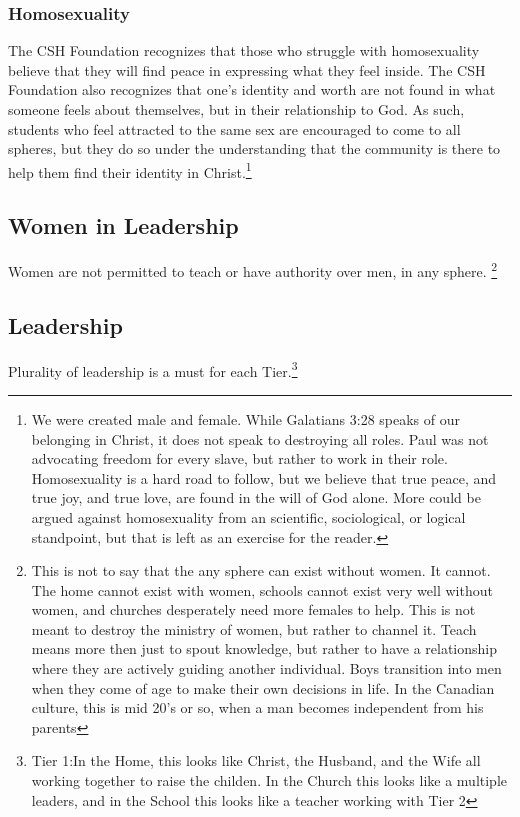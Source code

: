 \documentclass[CSHFoundation.tex]{subfiles}
\begin{document}
\subsubsection{Homosexuality}
The CSH Foundation recognizes that those who struggle with homosexuality believe that they will find peace in expressing what they feel inside. The CSH Foundation also recognizes that one's identity and worth are not found in what someone feels about themselves, but in their relationship to God. As such, students who feel attracted to the same sex are encouraged to come to all spheres, but they do so under the understanding that the community is there to help them find their identity in Christ.\footnote{We were created male and female. While Galatians 3:28 speaks of our belonging in Christ, it does not speak to destroying all roles. Paul was not advocating freedom for every slave, but rather to work in their role. Homosexuality is a hard road to follow, but we believe that true peace, and true joy, and true love, are found in the will of God alone. More could be argued against homosexuality from an scientific, sociological, or logical standpoint, but that is left as an exercise for the reader.}

\subsection{Women in Leadership}

Women are not permitted to teach or have authority over men, in any sphere. \footnote{This is not to say that the any sphere can exist without women. It cannot. The home cannot exist with women, schools cannot exist very well without women, and churches desperately need more females to help. This is not meant to destroy the ministry of women, but rather to channel it. Teach means more then just to spout knowledge, but rather to have a relationship where they are actively guiding another individual. Boys transition into men when they come of age to make their own decisions in life. In the Canadian culture, this is mid 20's or so, when a man becomes independent from his parents}

\subsection{Leadership}

Plurality of leadership is a must for each Tier.\footnote{Tier 1:In the Home, this looks like Christ, the Husband, and the Wife all working together to raise the childen. In the Church this looks like a multiple leaders, and in the School this looks like a teacher working with Tier 2}
\end{document}
